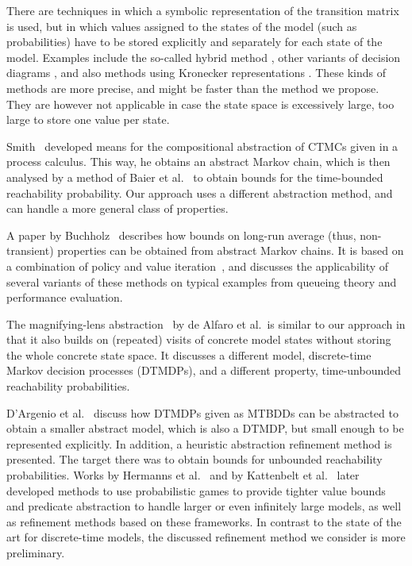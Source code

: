 \documentclass[10pt,twocolumn]{article}
\begin{document}
There are techniques in which a symbolic representation of the transition
matrix is used, but in which values assigned to the states of the model
(such as probabilities) have to be stored explicitly and separately for
each state of the model. Examples include the so-called hybrid method
\cite{Parker02,KwiatkowskaNP04}, other variants of decision diagrams
\cite{LampkaSOB10}, and also methods using Kronecker representations
\cite{Dayar12,BuchholzCDK00,BenoitPS06,FernandesPS98,BuchholzK04}.
These kinds of methods are more precise, and might be faster than the
method we propose. They are however not applicable in case the state space
is excessively large, too large to store one value per state.

Smith~\cite{Smith10} developed means for the compositional abstraction
of CTMCs given in a process calculus. This way, he obtains an
abstract Markov chain, which is then analysed by a method of Baier et
al.~\cite{BaierHKH05} to obtain bounds for the time-bounded
reachability probability. Our approach uses a different abstraction
method, and can handle a more general class of properties.

A paper by Buchholz~\cite{Buchholz11} describes how bounds on long-run
average (thus, non-transient) properties can be obtained from abstract
Markov chains. It is based on a combination of policy and value
iteration~\cite{Puterman94}, and discusses the applicability of
several variants of these methods on typical examples from queueing
theory and performance evaluation.

The magnifying-lens abstraction~\cite{AlfaroR07} by de Alfaro et
al.~is similar to our approach in that it also builds on (repeated)
visits of concrete model states without storing the whole concrete
state space. It discusses a different model, discrete-time Markov
decision processes (DTMDPs), and a different property, time-unbounded
reachability probabilities.

D'Argenio et al.~\cite{DArgenioJJL01} discuss how DTMDPs given as
MTBDDs can be abstracted to obtain a smaller abstract model, which is
also a DTMDP, but small enough to be represented explicitly. In
addition, a heuristic abstraction refinement method is presented. The
target there was to obtain bounds for unbounded reachability
probabilities. Works by Hermanns et al.~\cite{HermannsWZ08} and by
Kattenbelt et al.~\cite{KattenbeltKNP10} later developed methods to
use probabilistic games to provide tighter value bounds and predicate
abstraction to handle larger or even infinitely large models, as well
as refinement methods based on these frameworks. In contrast to the
state of the art for discrete-time models, the discussed refinement
method we consider is more preliminary.
\end{document}
